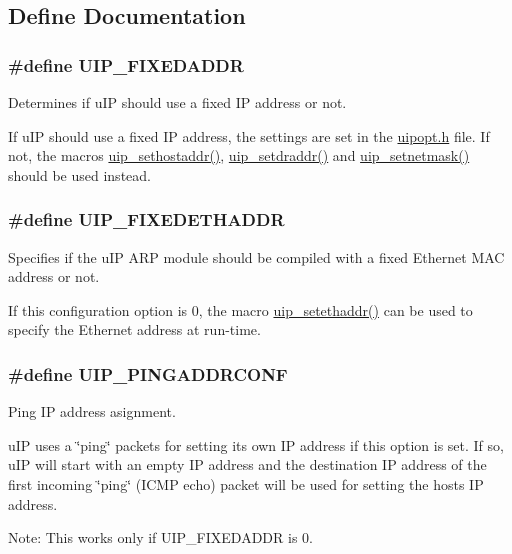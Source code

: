 \subsection{Define Documentation}
\hypertarget{a00071_g51195ea7cd5aa387a87f9d3b23905b62}{
\subsubsection[UIP\_\-FIXEDADDR]{\setlength{\rightskip}{0pt plus 5cm}\#define UIP\_\-FIXEDADDR}}
\label{a00071_g51195ea7cd5aa387a87f9d3b23905b62}


Determines if u\-IP should use a fixed IP address or not. 

If u\-IP should use a fixed IP address, the settings are set in the \hyperlink{a00058}{uipopt.h} file. If not, the macros \hyperlink{a00061_g12b467f314489259dd718228d0827a51}{uip\_\-sethostaddr()}, \hyperlink{a00061_g41d37ea1e3bd24f7b51e9409aceaaa80}{uip\_\-setdraddr()} and \hyperlink{a00061_geb79c914cf137e6d27fd7583e5a66679}{uip\_\-setnetmask()} should be used instead. \hypertarget{a00071_ge0f8cbeca9731af2171ffd37e79de893}{
\subsubsection[UIP\_\-FIXEDETHADDR]{\setlength{\rightskip}{0pt plus 5cm}\#define UIP\_\-FIXEDETHADDR}}
\label{a00071_ge0f8cbeca9731af2171ffd37e79de893}


Specifies if the u\-IP ARP module should be compiled with a fixed Ethernet MAC address or not. 

If this configuration option is 0, the macro \hyperlink{a00061_g30e827f33eacff55ecb4d8fb5a11d5d1}{uip\_\-setethaddr()} can be used to specify the Ethernet address at run-time. \hypertarget{a00071_g9069474ea570fd78c481aa164317dbaf}{
\subsubsection[UIP\_\-PINGADDRCONF]{\setlength{\rightskip}{0pt plus 5cm}\#define UIP\_\-PINGADDRCONF}}
\label{a00071_g9069474ea570fd78c481aa164317dbaf}


Ping IP address asignment. 

u\-IP uses a \char`\"{}ping\char`\"{} packets for setting its own IP address if this option is set. If so, u\-IP will start with an empty IP address and the destination IP address of the first incoming \char`\"{}ping\char`\"{} (ICMP echo) packet will be used for setting the hosts IP address.

\begin{Desc}
\item[Note:]This works only if UIP\_\-FIXEDADDR is 0. \end{Desc}
